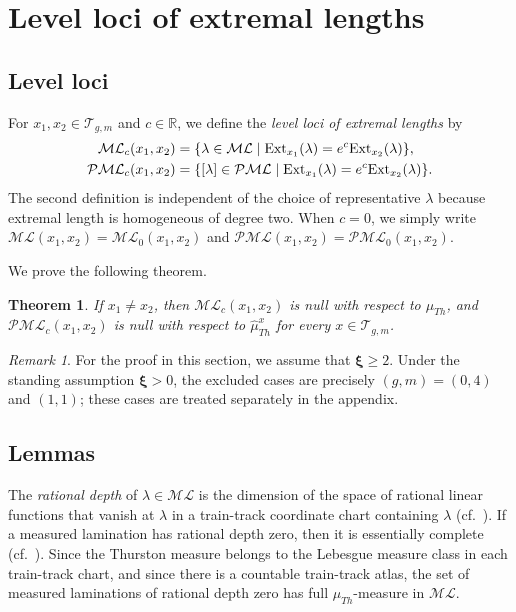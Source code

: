 \documentclass[dvipdfmx]{amsart}
\newtheorem{theorem}{Theorem}[section]
\theoremstyle{remark}
\newtheorem{remark}{Remark}[section]
\newcommand{\ext}{{\rm Ext}}
\newcommand{\teich}{\mathcal{T}}
\newcommand{\ThursM}{\mu_{Th}}
\newcommand{\PThursM}{\hat{\mu}_{Th}}
\newcommand{\convgenus}{{\boldsymbol \xi}}
\newcommand{\ml}{\mathcal{ML}}
\newcommand{\pml}{\mathcal{PML}}
\begin{document}
\section{Level loci of extremal lengths}

\subsection{Level loci}

For $x_1,x_2\in\teich_{g,m}$ and $c\in \mathbb{R}$, we define the \emph{level loci of extremal lengths} by
\begin{align*}
\ml_c(x_1,x_2)
&=\{\lambda\in\ml\mid \ext_{x_1}(\lambda)=e^c\ext_{x_2}(\lambda)\},\\
\pml_c(x_1,x_2)
&=\{[\lambda]\in\pml\mid \ext_{x_1}(\lambda)=e^c\ext_{x_2}(\lambda)\}.
\end{align*}
The second definition is independent of the choice of representative $\lambda$ because extremal length is homogeneous of degree two.
When $c=0$, we simply write $\ml(x_1,x_2)=\ml_0(x_1,x_2)$ and $\pml(x_1,x_2)=\pml_0(x_1,x_2)$.
 
We prove the following theorem.

\begin{theorem}
\label{thm:level_set}
If $x_1\ne x_2$, then $\ml_c(x_1,x_2)$ is null with respect to $\ThursM$, and $\pml_c(x_1,x_2)$ is null with respect to $\PThursM^x$ for every $x\in\teich_{g,m}$.
\end{theorem}

\begin{remark}
For the proof in this section, we assume that $\convgenus\ge2$. Under the standing assumption $\convgenus>0$, the excluded cases are precisely $(g,m)=(0,4)$ and $(1,1)$; these cases are treated separately in the appendix.
\end{remark}


\subsection{Lemmas}
\label{subsec:lemmas}

The \emph{rational depth} of $\lambda\in\ml$ is the dimension of the space of rational linear functions that vanish at $\lambda$ in a train-track coordinate chart containing $\lambda$ (cf.\ \cite[Definition 9.5.10]{Thurston-LectureNote}). If a measured lamination has rational depth zero, then it is essentially complete (cf.\ \cite[Proposition 9.5.11]{Thurston-LectureNote}). Since the Thurston measure belongs to the Lebesgue measure class in each train-track chart, and since there is a countable train-track atlas, the set of measured laminations of rational depth zero has full $\ThursM$-measure in $\ml$.
\end{document}
